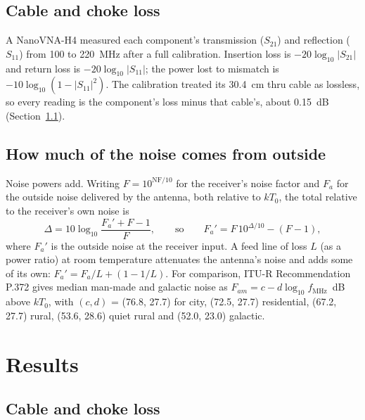 \documentclass[11pt]{article}
\begin{document}
\subsection{Cable and choke loss}
\label{sec:vnamethod}
A NanoVNA-H4 measured each component's transmission ($S_{21}$) and reflection ($S_{11}$) from 100 to
220~MHz after a full calibration. Insertion loss is $-20\log_{10}|S_{21}|$ and return loss is
$-20\log_{10}|S_{11}|$; the power lost to mismatch is $-10\log_{10}(1-|S_{11}|^2)$. The calibration
treated its 30.4~cm thru cable as lossless, so every reading is the component's loss minus that
cable's, about 0.15~dB (Section~\ref{sec:vna}).

\subsection{How much of the noise comes from outside}
\label{sec:budgetmethod}
Noise powers add. Writing $F = 10^{\text{NF}/10}$ for the receiver's noise factor and $F_a$ for the
outside noise delivered by the antenna, both relative to $kT_0$, the total relative to the
receiver's own noise is
\begin{equation}
\Delta = 10\log_{10}\frac{F_a' + F - 1}{F},
\qquad\text{so}\qquad
F_a' = F\,10^{\Delta/10} - (F-1),
\end{equation}
where $F_a'$ is the outside noise at the receiver input. A feed line of loss $L$ (as a power
ratio) at room temperature attenuates the antenna's noise and adds some of its own:
$F_a' = F_a/L + (1 - 1/L)$. For comparison, ITU-R Recommendation P.372 gives median man-made and
galactic noise as $F_{am} = c - d\log_{10} f_\text{MHz}$~dB above $kT_0$, with $(c,d)$ = (76.8, 27.7)
for city, (72.5, 27.7) residential, (67.2, 27.7) rural, (53.6, 28.6) quiet rural and (52.0, 23.0)
galactic.

\section{Results}

\subsection{Cable and choke loss}
\label{sec:vna}
\end{document}
